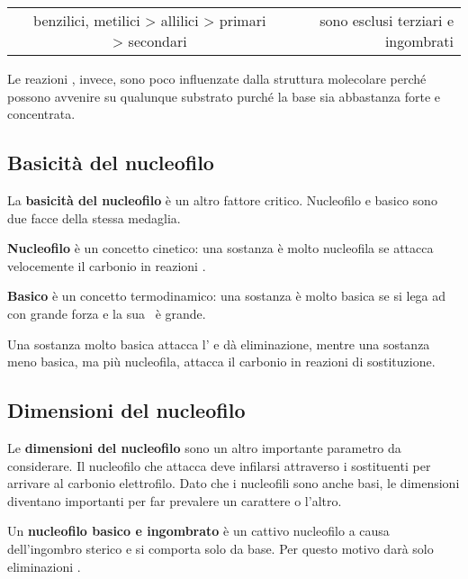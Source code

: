 \begin{center}
	\begin{tabular}{lcr}
		\mech[2] & benzilici, metilici > allilici > primari > secondari & sono esclusi terziari e ingombrati \\
	\end{tabular}
\end{center}

Le reazioni \mech[e2], invece, sono poco influenzate dalla struttura molecolare perché possono avvenire su qualunque substrato purché la base sia abbastanza forte e concentrata.


\subsection*{Basicità del nucleofilo}
La \textbf{basicità del nucleofilo} è un altro fattore critico. Nucleofilo e basico sono due facce della stessa medaglia.

\textbf{Nucleofilo} è un concetto cinetico: una sostanza è molto nucleofila se attacca velocemente il carbonio in reazioni \mech[2].

\textbf{Basico} è un concetto termodinamico: una sostanza è molto basica se si lega ad  con grande forza e la sua \Kb\ è grande.

Una sostanza molto basica attacca l’ e dà eliminazione, mentre una sostanza meno basica, ma più nucleofila, attacca il carbonio in reazioni di sostituzione.


\subsection*{Dimensioni del nucleofilo}
Le \textbf{dimensioni del nucleofilo} sono un altro importante parametro da considerare. Il nucleofilo che attacca deve infilarsi attraverso i sostituenti per arrivare al carbonio elettrofilo. Dato che i nucleofili sono anche basi, le dimensioni diventano importanti per far prevalere un carattere o l'altro.

Un \textbf{nucleofilo basico e ingombrato} è un cattivo nucleofilo a causa dell'ingombro sterico e si comporta solo da base. Per questo motivo darà solo eliminazioni \mech[e2].

